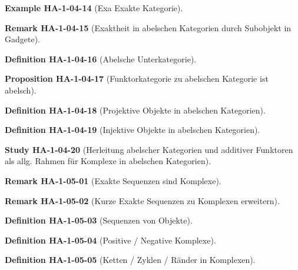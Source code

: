 \documentclass[10pt, letterpaper]{article}
\newcommand{\CustomHeading}[3]{%
  \par\medskip\noindent%
  \textbf{#1 #2} \textnormal{(#3)}.\enskip%
}
\newenvironment{DEF}[2]{\CustomHeading{Definition}{#1}{#2}}{}
\newenvironment{PROP}[2]{\CustomHeading{Proposition}{#1}{#2}}{}
\newenvironment{REM}[2]{\CustomHeading{Remark}{#1}{#2}}{}
\newenvironment{EXA}[2]{\CustomHeading{Example}{#1}{#2}}{}
\newenvironment{STUD}[2]{\CustomHeading{Study}{#1}{#2}}{}
\begin{document}
\begin{EXA}{HA-1-04-14}{Exa Exakte Kategorie}
\end{EXA}

\begin{REM}{HA-1-04-15}{Exaktheit in abelschen Kategorien durch Subobjekt in Gadgete}
\end{REM}

\begin{DEF}{HA-1-04-16}{Abelsche Unterkategorie}
\end{DEF}

\begin{PROP}{HA-1-04-17}{Funktorkategorie zu abelschen Kategorie ist abelsch}
\end{PROP}

\begin{DEF}{HA-1-04-18}{Projektive Objekte in abelschen Kategorien}
\end{DEF}

\begin{DEF}{HA-1-04-19}{Injektive Objekte in abelschen Kategorien}
\end{DEF}

\begin{STUD}{HA-1-04-20}{Herleitung abelscher Kategorien und additiver Funktoren als allg. Rahmen für Komplexe in abelschen Kategorien}
\end{STUD}

\begin{REM}{HA-1-05-01}{Exakte Sequenzen sind Komplexe}
\end{REM}

\begin{REM}{HA-1-05-02}{Kurze Exakte Sequenzen zu Komplexen erweitern}
\end{REM}

\begin{DEF}{HA-1-05-03}{Sequenzen von Objekte}
\end{DEF}

\begin{DEF}{HA-1-05-04}{Positive / Negative Komplexe}
\end{DEF}

\begin{DEF}{HA-1-05-05}{Ketten / Zyklen / Ränder in Komplexen}
\end{DEF}
\end{document}
